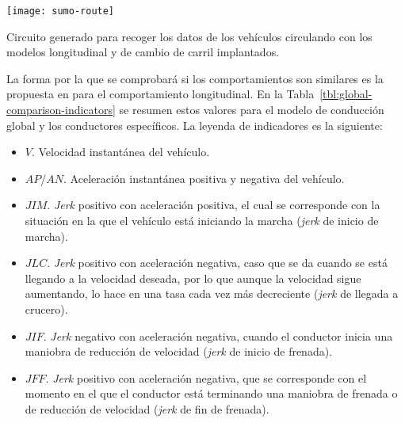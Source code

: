 \begin{marginfigure}
	\centering
	\texttt{[image: sumo-route]}
	\caption[Circuito de prueba en el entorno virtual]{Circuito generado para recoger los datos de los vehículos circulando con los modelos longitudinal y de cambio de carril implantados.}
	\label{fig:sumo-route}
\end{marginfigure}

La forma por la que se comprobará si los comportamientos son similares es la propuesta en \cite{DiazAlvarez2014} para el comportamiento longitudinal. En la Tabla~\ref{tbl:global-comparison-indicators} se resumen estos valores para el modelo de conducción global y los conductores específicos. La leyenda de indicadores es la siguiente:

\begin{itemize}
	\item $V$. Velocidad instantánea del vehículo.
	\item $AP$/$AN$. Aceleración instantánea positiva y negativa del vehículo.
	\item $JIM$. \textit{Jerk} positivo con aceleración positiva, el cual se corresponde con la situación en la que el vehículo está iniciando la marcha (\textit{jerk} de inicio de marcha).
	\item $JLC$. \textit{Jerk} positivo con aceleración negativa, caso que se da cuando se está llegando a la velocidad deseada, por lo que aunque la velocidad sigue aumentando, lo hace en una tasa cada vez más decreciente (\textit{jerk} de llegada a crucero).
	\item $JIF$. \textit{Jerk} negativo con aceleración negativa, cuando el conductor inicia una maniobra de reducción de velocidad (\textit{jerk} de inicio de frenada).
	\item $JFF$. \textit{Jerk} positivo con aceleración negativa, que se corresponde con el momento en el que el conductor está terminando una maniobra de frenada o de reducción de velocidad (\textit{jerk} de fin de frenada).
\end{itemize}

